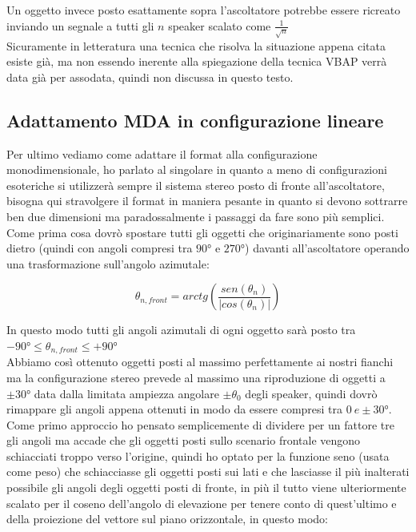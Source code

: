 \documentclass[12pt,a4paper]{report}
\begin{document}
Un oggetto invece posto esattamente sopra l'ascoltatore potrebbe essere ricreato inviando un segnale a tutti gli $n$ speaker scalato come $\frac{1}{\sqrt{n}}$\\

Sicuramente in letteratura una tecnica che risolva la situazione appena citata esiste già, ma non essendo inerente alla spiegazione della tecnica VBAP verrà data già per assodata, quindi non discussa in questo testo.

\subsection{Adattamento MDA in configurazione lineare}

Per ultimo vediamo come adattare il format alla configurazione monodimensionale, ho parlato al singolare in quanto a meno di configurazioni esoteriche si utilizzerà sempre il sistema stereo posto di fronte all'ascoltatore, bisogna qui stravolgere il format in maniera pesante in quanto si devono sottrarre ben due dimensioni ma paradossalmente i passaggi da fare sono più semplici.\\

Come prima cosa dovrò spostare tutti gli oggetti che originariamente sono posti dietro (quindi con angoli compresi tra $90°$ e $270°$) davanti all'ascoltatore operando una trasformazione sull'angolo azimutale:

\begin{equation}
\theta_{n,front} = arctg  \left( \dfrac{sen(\theta_n)}{\vert cos(\theta_n)\vert } \right)
\label{llll}
\end{equation}

In questo modo tutti gli angoli azimutali di ogni oggetto sarà posto tra $-90° \leq \theta_{n,front} \leq +90°$\\

Abbiamo così ottenuto oggetti posti al massimo perfettamente ai nostri fianchi ma la configurazione stereo prevede al massimo una riproduzione di oggetti a $\pm 30°$ data dalla limitata ampiezza angolare $\pm \theta_0$ degli speaker, quindi dovrò rimappare gli angoli appena ottenuti in modo da essere compresi tra $0\ e \pm 30°$.\\

Come primo approccio ho pensato semplicemente di dividere per un fattore tre gli angoli ma accade che gli oggetti posti sullo scenario frontale vengono schiacciati troppo verso l'origine, quindi ho optato per la funzione seno (usata come peso) che schiacciasse gli oggetti posti sui lati e che lasciasse il più inalterati possibile gli angoli degli oggetti posti di fronte, in più il tutto viene ulteriormente scalato per il coseno dell'angolo di elevazione per tenere conto di quest'ultimo e della proiezione del vettore sul piano orizzontale, in questo modo:
\end{document}
